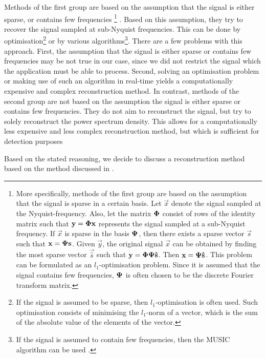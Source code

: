 \documentclass[a4paper, openany, oneside]{memoir}
\begin{document}
Methods of the first group are based on the assumption that the signal is either sparse, or contains few frequencies%
\footnote{More specifically, methods of the first group are based on the assumption that the signal is sparse in a certain basis. Let $\vec{x}$ denote the signal sampled at the Nyquist-frequency. Also, let the matrix $\boldsymbol{\mathbf{\Phi}}$ consist of rows of the identity matrix such that $\boldsymbol{\mathbf{y}}=\boldsymbol{\mathbf{\Phi}}\boldsymbol{\mathbf{x}}$ represents the signal sampled at a sub-Nyquist frequency. If $\vec{x}$ is sparse in the basis $\boldsymbol{\mathbf{\Psi}}$, then there exists a sparse vector $\vec{s}$ such that $\boldsymbol{\mathbf{x}}=\boldsymbol{\mathbf{\Psi}}\boldsymbol{\mathbf{s}}$. Given $\vec{y}$, the original signal $\vec{x}$ can be obtained by finding the most sparse vector $\vec{\hat{s}}$ such that $\boldsymbol{\mathbf{y}}=\boldsymbol{\mathbf{\Phi}}\boldsymbol{\mathbf{\Psi}}\boldsymbol{\mathbf{\hat{s}}}$. Then $\boldsymbol{\mathbf{x}} = \boldsymbol{\mathbf{\Psi}}\boldsymbol{\mathbf{\hat{s}}}$. This problem can be formulated as an $l_1$-optimisation problem. Since it is assumed that the signal contains few frequencies, $\boldsymbol{\mathbf{\Psi}}$ is often chosen to be the discrete Fourier transform matrix.}%
. Based on this assumption, they try to recover the signal sampled at sub-Nyquist frequencies. This can be done by optimisation\footnote{If the signal is assumed to be sparse, then $l_1$-optimisation is often used. Such optimisation consists of minimising the $l_1$-norm of a vector, which is the sum of the absolute value of the elements of the vector.} or by various algorithms\footnote{If the signal is assumed to contain few frequencies, then the MUSIC algorithm can be used \cite{pal2011coprime}.}. There are a few problems with this approach. First, the assumption that the signal is either sparse or contains few frequencies may be not true in our case, since we did not restrict the signal which the application must be able to process. Second, solving an optimisation problem or making use of such an algorithm in real-time yields a computationally expensive and complex reconstruction method. In contrast, methods of the second group are not based on the assumption the signal is either sparse or contains few frequencies. They do not aim to reconstruct the signal, but try to solely reconstruct the power spectrum density. This allows for a computationally less expensive and less complex reconstruction method, but which is sufficient for detection purposes

Based on the stated reasoning, we decide to discuss a reconstruction method based on the method discussed in \cite{ariananda2012compressive}.
\end{document}

